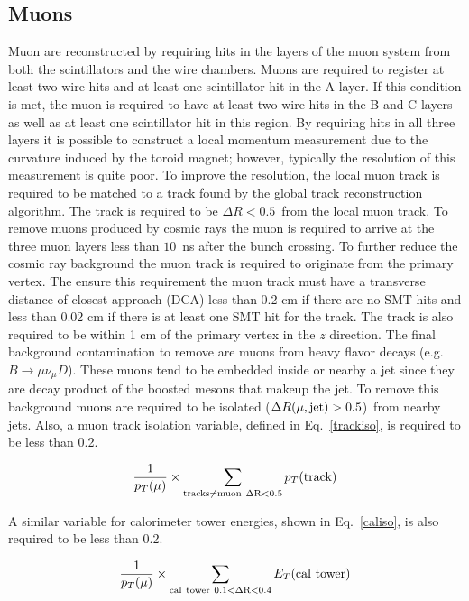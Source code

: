 \subsection{Muons}
\label{muonreco}
Muon are reconstructed by requiring hits in the layers of the muon system from both the scintillators and the wire chambers. Muons are required to register at least two wire hits and at least one scintillator hit in the A layer. If this condition is met, the muon is required to have at least two wire hits in the B and C layers as well as at least one scintillator hit in this region. By requiring hits in all three layers it is possible to construct a local momentum measurement due to the curvature induced by the toroid magnet; however, typically the resolution of this measurement is quite poor. To improve the resolution, the local muon track is required to be matched to a track found by the global track reconstruction algorithm. The track is required to be $\Delta R<0.5$~from the local muon track. To remove muons produced by cosmic rays the muon is required to arrive at the three muon layers less than $10$~ns after the bunch crossing. To further reduce the cosmic ray background the muon track is required to originate from the primary vertex. The ensure this requirement the muon track must have a transverse distance of closest approach (DCA) less than 0.2 cm if there are no SMT hits and less than 0.02 cm if there is at least one SMT hit for the track. The track is also required to be within 1 cm of the primary vertex in the $z$ direction. The final background contamination to remove are muons from heavy flavor decays (e.g. $B \rightarrow \mu\nu_{\mu} D$). These muons tend to be embedded inside or nearby a jet since they are decay product of the boosted mesons that makeup the jet. To remove this background muons are required to be isolated ($\Delta R(\mu,\rm{jet}) > 0.5$)~from nearby jets. Also, a muon track isolation variable, defined in Eq.~\ref{trackiso}, is required to be less than 0.2. 

\begin{equation}
\label{trackiso}
\frac{1}{p_{T}(\mu)} \times \sum_{\rm{tracks \neq muon~ \Delta R < 0.5 }}p_{T}(\rm{track})
\end{equation}

A similar variable for calorimeter tower energies, shown in Eq.~\ref{caliso}, is also required to be less than 0.2.

\begin{equation}
\label{caliso}
\frac{1}{p_{T}(\mu)} \times \sum_{\rm{cal~tower~0.1 < \Delta R < 0.4 }}E_{T}(\rm{cal~tower})
\end{equation}

